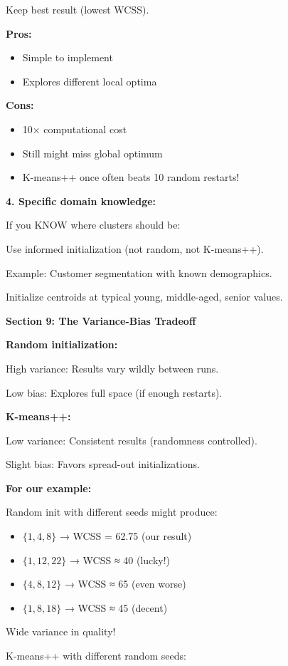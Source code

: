 \documentclass[12pt]{article}
\begin{document}
\begin{explanation}
Keep best result (lowest WCSS).

\textbf{Pros:}
\begin{itemize}
    \item Simple to implement
    \item Explores different local optima
\end{itemize}

\textbf{Cons:}
\begin{itemize}
    \item 10× computational cost
    \item Still might miss global optimum
    \item K-means++ once often beats 10 random restarts!
\end{itemize}

\textbf{4. Specific domain knowledge:}

If you KNOW where clusters should be:

Use informed initialization (not random, not K-means++).

Example: Customer segmentation with known demographics.

Initialize centroids at typical {young, middle-aged, senior} values.

\textbf{Section 9: The Variance-Bias Tradeoff}

\textbf{Random initialization:}

High variance: Results vary wildly between runs.

Low bias: Explores full space (if enough restarts).

\textbf{K-means++:}

Low variance: Consistent results (randomness controlled).

Slight bias: Favors spread-out initializations.

\textbf{For our example:}

Random init with different seeds might produce:
\begin{itemize}
    \item $\{1, 4, 8\}$ → WCSS = 62.75 (our result)
    \item $\{1, 12, 22\}$ → WCSS ≈ 40 (lucky!)
    \item $\{4, 8, 12\}$ → WCSS ≈ 65 (even worse)
    \item $\{1, 8, 18\}$ → WCSS ≈ 45 (decent)
\end{itemize}

Wide variance in quality!

K-means++ with different random seeds:


\end{explanation}
\end{document}
